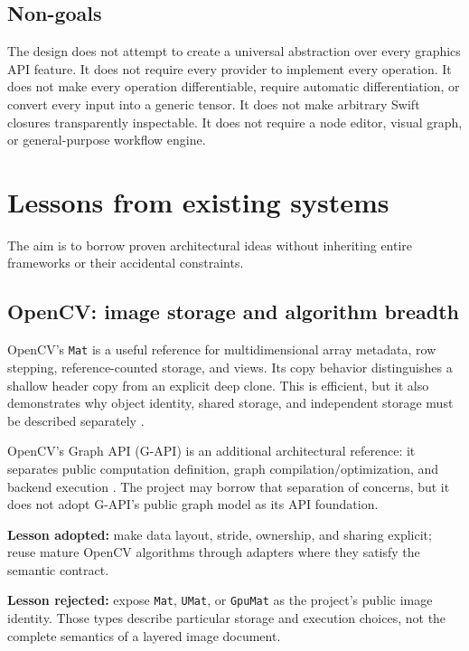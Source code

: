 \documentclass[11pt,a4paper,oneside]{article}
\begin{document}
\subsection{Non-goals}

The design does not attempt to create a universal abstraction over every graphics API feature. It does not require every provider to implement every operation. It does not make every operation differentiable, require automatic differentiation, or convert every input into a generic tensor. It does not make arbitrary Swift closures transparently inspectable. It does not require a node editor, visual graph, or general-purpose workflow engine.

\section{Lessons from existing systems}

The aim is to borrow proven architectural ideas without inheriting entire frameworks or their accidental constraints.

\subsection{OpenCV: image storage and algorithm breadth}

OpenCV's \texttt{Mat} is a useful reference for multidimensional array metadata, row stepping, reference-counted storage, and views. Its copy behavior distinguishes a shallow header copy from an explicit deep clone. This is efficient, but it also demonstrates why object identity, shared storage, and independent storage must be described separately \cite{opencv-mat}.

OpenCV's Graph API (G-API) is an additional architectural reference: it separates public computation definition, graph compilation/optimization, and backend execution \cite{opencv-gapi}. The project may borrow that separation of concerns, but it does not adopt G-API's public graph model as its API foundation.

\textbf{Lesson adopted:} make data layout, stride, ownership, and sharing explicit; reuse mature OpenCV algorithms through adapters where they satisfy the semantic contract.

\textbf{Lesson rejected:} expose \texttt{Mat}, \texttt{UMat}, or \texttt{GpuMat} as the project's public image identity. Those types describe particular storage and execution choices, not the complete semantics of a layered image document.
\end{document}
